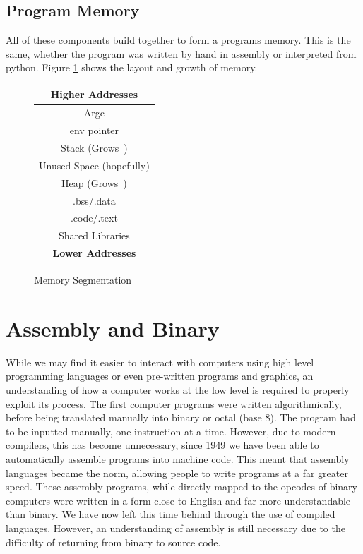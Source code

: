 					\subsection{Program Memory}
						All of these components build together to form a programs memory.
						This is the same, whether the program was written by hand in assembly or interpreted from python.
						Figure \ref{fig:ProgramMemory} shows the layout and growth of memory\cite{shellcodersHandbook}.
						\begin{figure}[htb]
							\centering
							\begin{tabular}{c}
								 \toprule
								 \textbf{Higher Addresses}\enspace\arrowkeyup \\
								 \toprule
								 Argc \\
								 env pointer \\
								 Stack (Grows \arrowkeydown\,) \\
								 Unused Space (hopefully) \\
								 Heap (Grows \arrowkeyup\,) \\
								 .bss/.data \\
								 .code/.text \\
								 Shared Libraries \\
								 \textbf{Lower Addresses}\enspace\arrowkeydown \\
								 \bottomrule
							 \end{tabular}
							 \caption{Memory Segmentation}
							 \label{fig:ProgramMemory}
						 \end{figure}


	\section{Assembly and Binary}
		While we may find it easier to interact with computers using high level programming languages or even pre-written programs and graphics, an understanding of how a computer works at the low level is required to properly exploit its process.
		The first computer programs were written algorithmically, before being translated manually into binary or octal (base 8).
		The program had to be inputted manually, one instruction at a time.
		However, due to modern compilers, this has become unnecessary, since 1949 we have been able to automatically assemble programs into machine code.
		This meant that assembly languages became the norm, allowing people to write programs at a far greater speed.
		These assembly programs, while directly mapped to the opcodes of binary computers were written in a form close to English and far more understandable than binary.
		We have now left this time behind through the use of compiled languages.
		However, an understanding of assembly is still necessary due to the difficulty of returning from binary to source code.
